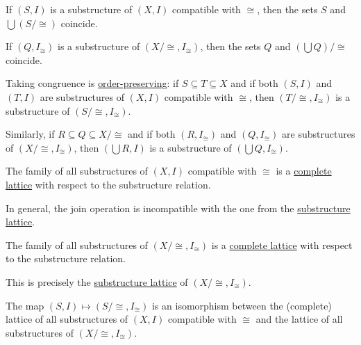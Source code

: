 \begin{theorem}
\begin{thmenum}
     If \( (S, I) \) is a substructure of \( (X, I) \) compatible with \( {\cong} \), then the sets \( S \) and \( \bigcup (S / {\cong}) \) coincide.

     If \( (Q, I_\cong) \) is a substructure of \( (X / {\cong}, I_\cong) \), then the sets \( Q \) and \( (\bigcup Q) / {\cong} \) coincide.

     Taking congruence is \hyperref[def:order_function/preserving]{order-preserving}: if \( S \subseteq T \subseteq X \) and if both \( (S, I) \) and \( (T, I) \) are substructures of \( (X, I) \) compatible with \( {\cong} \), then \( (T / {\cong}, I_\cong) \) is a substructure of \( (S / {\cong}, I_\cong) \).

     Similarly, if \( R \subseteq Q \subseteq X / {\cong} \) and if both \( (R, I_\cong) \) and \( (Q, I_\cong) \) are substructures of \( (X / {\cong}, I_\cong) \), then \( (\bigcup R, I) \) is a substructure of \( (\bigcup Q, I_\cong) \).

     The family of all substructures of \( (X, I) \) compatible with \( {\cong} \) is a \hyperref[def:semilattice/lattice]{complete lattice} with respect to the substructure relation.

    In general, the join operation is incompatible with the one from the \hyperref[thm:substructures_form_complete_lattice]{substructure lattice}.

     The family of all substructures of \( (X / {\cong}, I_\cong) \) is a \hyperref[def:semilattice/lattice]{complete lattice} with respect to the substructure relation.

    This is precisely the \hyperref[thm:substructures_form_complete_lattice]{substructure lattice} of \( (X / {\cong}, I_\cong) \).

     The map \( (S, I) \mapsto (S / {\cong}, I_\cong) \) is an isomorphism between the (complete) lattice of all substructures of \( (X, I) \) compatible with \( {\cong} \) and the lattice of all substructures of \( (X / {\cong}, I_\cong) \).
  \end{thmenum}
\end{theorem}
